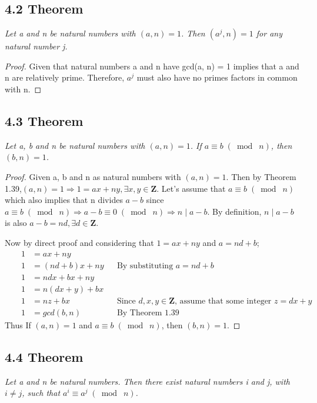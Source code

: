 \documentclass{article}
\begin{document}
\subsection*{4.2 Theorem} 
\quad \textit{Let a and n be natural numbers with $(a, n) = 1$. Then $(a^j, n) = 1$ for any natural number j.}

\begin{proof}
Given that natural numbers a and n have gcd(a, n) = 1 implies that a and n are relatively prime. Therefore, $a^j$ must also have no primes factors in common with n.
\end{proof}

\subsection*{4.3 Theorem} 
\quad \textit{Let a, b and n be natural numbers with $(a, n) = 1$. If $a \equiv b \;(\bmod\; n)$, then $(b, n) = 1$.}

\begin{proof}
Given a, b and n as natural numbers with $(a, n) = 1$. Then by Theorem 1.39,$(a, n) = 1 \Longrightarrow 1 = ax + ny, \exists x, y \in \mathbf{Z}$. Let's assume that $a \equiv b \;(\bmod\; n)$ which also implies that n divides $a - b$ since $a \equiv b \;(\bmod\; n) \Longrightarrow a - b \equiv 0 \;(\bmod\; n) \Longrightarrow n \mid a - b$. By definition, $n \mid a - b$ is also $ a - b = nd, \exists d \in \mathbf{Z}$.

Now by direct proof and considering that $1 = ax + ny$ and $a= nd + b$;
\begin{align*}
    && 1 &= ax + ny&&\\
    && 1 &= (nd + b)x + ny&& \text{By substituting $a= nd + b$}\\
    && 1 &= ndx + bx + ny&&\\
    && 1 &= n(dx + y) + bx&&\\
    && 1 &= nz + bx&& \text{Since $d,x,y \in \mathbf{Z}$, assume that some integer $z = dx + y$}\\
    && 1 &= gcd(b, n)&& \text{By Theorem 1.39}
\end{align*}
Thus If $(a,n) = 1$ and $a \equiv b \;(\bmod\; n)$, then $(b, n) = 1$.
\end{proof}

\subsection*{4.4 Theorem} 
\quad \textit{Let a and n be natural numbers. Then there exist natural numbers i and j, with $i \neq j$, such that $a^i \equiv a^j \;(\bmod\; n)$.}
\end{document}
